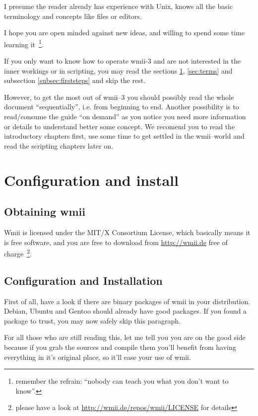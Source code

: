 \documentclass[12pt,a4paper]{article} %
\newcommand{\hrefx}[1]{\href{#1}{#1}} %
\begin{document}
    I presume the reader already has experience with Unix, knows all
    the basic terminology and concepts like files or editors.

    I hope you are open minded against new ideas, and willing to spend
    some time learning it~\footnote{remember the refrain: ``nobody can
    teach you what you don't want to know''.}.

    If you only want to know how to operate wmii-3 and are not
    interested in the inner workings or in scripting, you may read the
    sections \ref{sec:conf&install}, \ref{sec:terms} and subsection 
    \ref{subsec:firststeps} and skip the rest.

    However, to get the most out of wmii--3 you should possibly read
    the whole document ``sequentially'', i.e. from beginning to end.
    Another possibility is to read/consume the guide ``on demand''
    as you notice you need more information or details to understand
    better some concept. We recomend you to read the introductory
    chapters first, use some time to get settled in the wmii--world
    and read the scripting chapters later on.
  
\section{Configuration and install}
\label{sec:conf&install}

  \subsection{Obtaining wmii}

    Wmii is licensed under the MIT/X Consortium License, which
    basically means it is free software, and you are free to download
    from \hrefx{http://wmii.de} free of charge~\footnote{ please have
    a look at \hrefx{http://wmii.de/repos/wmii/LICENSE}  for
    details}.
  
  \subsection{Configuration and Installation}
  
    First of all, have a look if there are binary packages of wmii in
    your distribution. Debian, Ubuntu and Gentoo should already have
    good packages. If you found a package to trust, you may now safely
    skip this paragraph.

    For all those who are still reading this, let me tell you you are
    on the good side because if you grab the sources and compile them
    you'll benefit from having everything in it's original place, so
    it'll ease your use of wmii.
    
\end{document}
